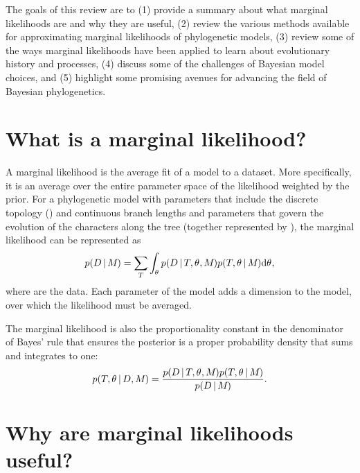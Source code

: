 The goals of this review are to
(1) provide a summary about what marginal likelihoods are and why they are
useful,
(2) review the various methods available for approximating marginal likelihoods
of phylogenetic models,
(3) review some of the ways marginal likelihoods have been applied to learn
about evolutionary history and processes,
(4) discuss some of the challenges of Bayesian model choices, and
(5) highlight some promising avenues for advancing the field of Bayesian
phylogenetics.

\section{What is a marginal likelihood?}

\begin{linenomath}
A marginal likelihood is the average fit of a model to a dataset.
More specifically, it is an average over the entire parameter space of the
likelihood weighted by the prior.
For a phylogenetic model \model with parameters that include the discrete
topology (\topology) and continuous branch lengths and parameters that govern
the evolution of the characters along the tree (together represented by
\evoparameters), the marginal likelihood can be represented as
\begin{equation}
    p(D \,|\, M_{}) =
    \sum\limits_{T}
    \int_{\theta_{}}
    p( D \,|\, T, \theta_{}, M_{})
    p(T, \theta_{} \,|\, M_{})
    \mathrm{d}\theta_{},
    \label{eq:marginalLikelihood}
\end{equation}
where \data are the data.
Each parameter of the model adds a dimension to the model, over which the
likelihood must be averaged.
\end{linenomath}

\begin{linenomath}
The marginal likelihood is also the proportionality constant in the denominator
of Bayes' rule that ensures the posterior is a proper probability density that
sums and integrates to one:
\begin{equation}
    p(T, \theta_{} \,|\, D, M_{}) = \frac{
        p(D \,|\, T, \theta_{}, M_{})
        p(T, \theta_{} \,|\, M_{})
    }{
        p(D \,|\, M_{})
    }.
    \label{eq:bayesRule}
\end{equation}
\end{linenomath}

\section{Why are marginal likelihoods useful?}


